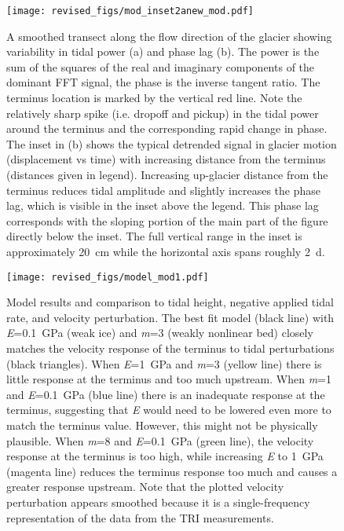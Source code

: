 \documentclass[review]{igs}
\begin{document}
\begin{figure}
\centering
\texttt{[image: revised\_figs/mod\_inset2anew\_mod.pdf]}
\caption{A smoothed transect along the flow direction of the glacier showing variability in tidal power (a) and phase lag (b). The power is the sum of the squares of the real and imaginary components of the dominant FFT signal, the phase is the inverse tangent ratio.  The terminus location is marked by the vertical red line. Note the relatively sharp spike (i.e. dropoff and pickup) in the tidal power around the terminus and the corresponding rapid change in phase. The inset in (b) shows the typical detrended signal in glacier motion (displacement vs time) with increasing distance from the terminus (distances given in legend). Increasing up-glacier distance from the terminus reduces tidal amplitude and slightly increases the phase lag, which is visible in the inset above the legend. This phase lag corresponds with the sloping portion of the main part of the figure directly below the inset. The full vertical range in the inset is approximately 20~cm while the horizontal axis spans roughly 2~d.}
\label{fig:profiles}
\end{figure}

\begin{figure}
\centering
\texttt{[image: revised\_figs/model\_mod1.pdf]}
\caption{Model results and comparison to tidal height, negative applied tidal rate, and velocity perturbation. The best fit model (black line) with \textit{E}=0.1~GPa (weak ice) and \textit{m}=3 (weakly nonlinear bed) closely matches the velocity response of the terminus to tidal perturbations (black triangles). When \textit{E}=1~GPa and \textit{m}=3 (yellow line) there is little response at the terminus and too much upstream. When \textit{m}=1 and \textit{E}=0.1~GPa (blue line) there is an inadequate response at the terminus, suggesting that \textit{E} would need to be lowered even more to match the terminus value. However, this might not be physically plausible. When \textit{m}=8 and \textit{E}=0.1~GPa (green line), the velocity response at the terminus is too high, while increasing \textit{E} to 1~GPa (magenta line) reduces the terminus response too much and causes a greater response upstream. Note that the plotted velocity perturbation appears smoothed because it is a single-frequency representation of the data from the TRI measurements. }
\label{fig:model}
\end{figure}

\end{document}

